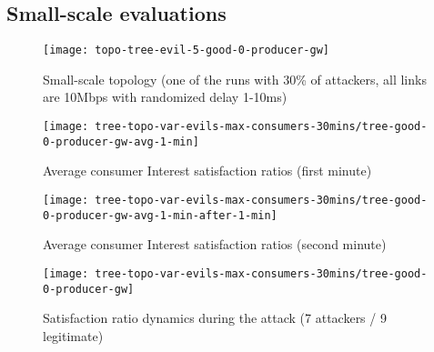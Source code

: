 \subsection{Small-scale evaluations}
\label{sec:small-scale}

\begin{figure}[htbp]
  \centering
  \texttt{[image: topo-tree-evil-5-good-0-producer-gw]}
  \caption{Small-scale topology (one of the runs with 30\% of attackers, all links are 10Mbps with randomized delay 1-10ms)}
  \label{fig:small-scale-topo}
\end{figure}


\begin{figure}[htbp]
  \centering
  \texttt{[image: tree-topo-var-evils-max-consumers-30mins/tree-good-0-producer-gw-avg-1-min]}
  \caption{Average consumer Interest satisfaction ratios (first minute)}
  \label{fig:small-scale-topo 1}
\end{figure}


\begin{figure}[htbp]
  \centering
  \texttt{[image: tree-topo-var-evils-max-consumers-30mins/tree-good-0-producer-gw-avg-1-min-after-1-min]}
  \caption{Average consumer Interest satisfaction ratios (second minute)}
  \label{fig:small-scale-topo 2}
\end{figure}

\begin{figure*}[t]
  \centering
  \texttt{[image: tree-topo-var-evils-max-consumers-30mins/tree-good-0-producer-gw]}
  \caption{Satisfaction ratio dynamics during the attack (7 attackers / 9 legitimate)}
  \label{fig:small-scale-topo 3}
\end{figure*}



